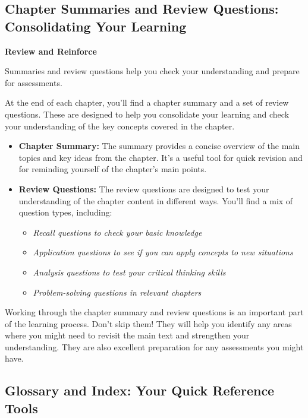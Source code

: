 \subsection{Chapter Summaries and Review Questions: Consolidating Your Learning}

\begin{marginnote}
\textbf{Review and Reinforce}

Summaries and review questions help you check your understanding and prepare for assessments.
\end{marginnote}
At the end of each chapter, you’ll find a chapter summary and a set of review questions.  These are designed to help you consolidate your learning and check your understanding of the key concepts covered in the chapter.

\begin{itemize}
    \item \textbf{Chapter Summary:}  The summary provides a concise overview of the main topics and key ideas from the chapter.  It’s a useful tool for quick revision and for reminding yourself of the chapter's main points.
    \item \textbf{Review Questions:}  The review questions are designed to test your understanding of the chapter content in different ways.  You’ll find a mix of question types, including:
        \begin{itemize}
            \item \textit{Recall questions to check your basic knowledge}
            \item \textit{Application questions to see if you can apply concepts to new situations}
            \item \textit{Analysis questions to test your critical thinking skills}
            \item \textit{Problem-solving questions in relevant chapters}
        \end{itemize}
\end{itemize}

Working through the chapter summary and review questions is an important part of the learning process.  Don’t skip them!  They will help you identify any areas where you might need to revisit the main text and strengthen your understanding.  They are also excellent preparation for any assessments you might have.

\subsection{Glossary and Index: Your Quick Reference Tools}


